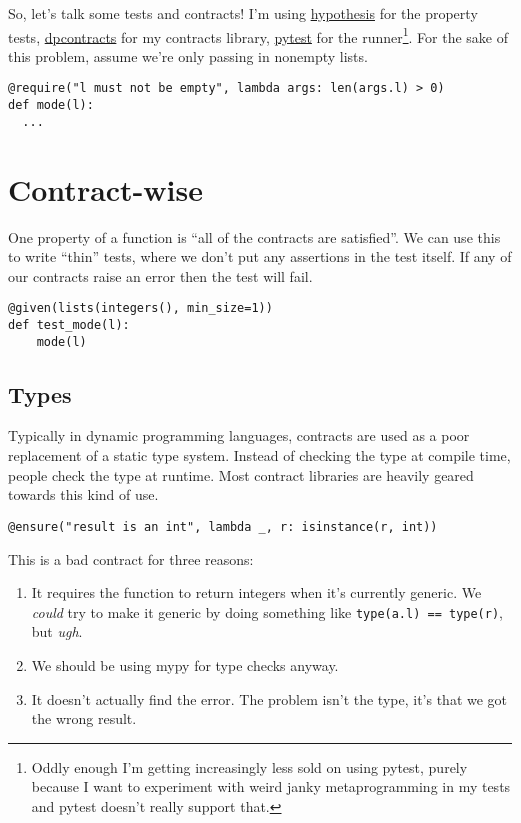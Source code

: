 So, let's talk some tests and contracts! I'm using
\href{http://hypothesis.works/}{hypothesis} for the property tests,
\href{https://github.com/deadpixi/contracts}{dpcontracts} for my
contracts library, \href{https://docs.pytest.org/en/latest/}{pytest} for
the runner\footnote{Oddly enough I'm getting increasingly less sold on using pytest, purely because I want to experiment with weird janky metaprogramming in my tests and pytest doesn't really support that.}.
For the sake of this problem, assume we're only passing in nonempty
lists.

\begin{verbatim}
@require("l must not be empty", lambda args: len(args.l) > 0)
def mode(l):
  ...
\end{verbatim}

\section{Contract-wise}\label{contract-wise}

One property of a function is ``all of the contracts are satisfied''. We
can use this to write ``thin'' tests, where we don't put any assertions
in the test itself. If any of our contracts raise an error then the test
will fail.

\begin{verbatim}
@given(lists(integers(), min_size=1))
def test_mode(l):
    mode(l)
\end{verbatim}

\subsection{Types}\label{types}

Typically in dynamic programming languages, contracts are used as a poor
replacement of a static type system. Instead of checking the type at
compile time, people check the type at runtime. Most contract libraries
are heavily geared towards this kind of use.

\begin{verbatim}
@ensure("result is an int", lambda _, r: isinstance(r, int))
\end{verbatim}
This is a bad contract for three reasons:

\begin{enumerate}
\item
  It requires the function to return integers when it's currently
  generic. We \emph{could} try to make it generic by doing something
  like \texttt{type(a.l)\ ==\ type(r)}, but \emph{ugh}.
\item
  We should be using mypy for type checks anyway.
\item
  It doesn't actually find the error. The problem isn't the type, it's
  that we got the wrong result.
\end{enumerate}

